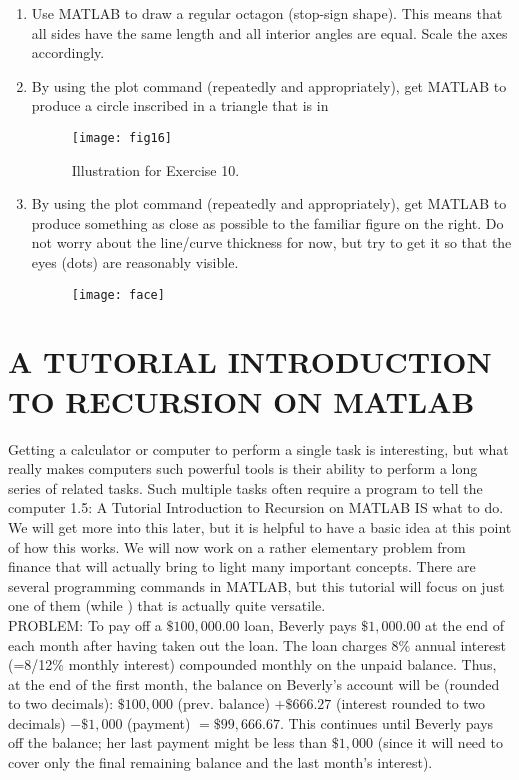 \documentclass[../main.tex]{subfiles}
\begin{document}
\begin{enumerate}
\item Use MATLAB to draw a regular octagon (stop-sign shape). This means that all sides have the same length and all interior angles are equal. Scale the axes accordingly.
\item By using the plot command (repeatedly and appropriately), get MATLAB to produce a circle inscribed in a triangle that is in 

\begin{figure}[H]
\texttt{[image: fig16]}
\caption{ Illustration for Exercise 10.}
\end{figure}

\item By using the plot command (repeatedly and appropriately), get MATLAB to produce something as close as possible to the familiar figure on the right. Do not worry about the line/curve thickness for now, but try to get it so that the eyes (dots) are reasonably visible.
\begin{figure}[H]
\texttt{[image: face]}
\end{figure}

\end{enumerate}

\section{A TUTORIAL INTRODUCTION TO RECURSION ON MATLAB}

Getting a calculator or computer to perform a single task is interesting, but what
really makes computers such powerful tools is their ability to perform a long series
of related tasks. Such multiple tasks often require a program to tell the computer
1.5: A Tutorial Introduction to Recursion on MATLAB IS
what to do. We will get more into this later, but it is helpful to have a basic idea at
this point of how this works. We will now work on a rather elementary problem
from finance that will actually bring to light many important concepts. There are
several programming commands in MATLAB, but this tutorial will focus on just
one of them (while ) that is actually quite versatile. \\

PROBLEM: To pay off a $\$ 100,000.00$ loan, Beverly pays $\$ 1,000.00$ at the end of each month after having taken out the loan. The loan charges $8 \%$ annual interest (=8/12\% monthly interest) compounded monthly on the unpaid balance. Thus, at the end of the first month, the balance on Beverly's account will be (rounded to two decimals): $\$ 100,000$ (prev. balance) $+\$ 666.27$ (interest rounded to two decimals) $-\$ 1,000$ (payment) $=\$ 99,666.67$. This continues until Beverly pays off the balance; her last payment might be less than $\$ 1,000$ (since it will need to cover only the final remaining balance and the last month's interest).
\end{document}
